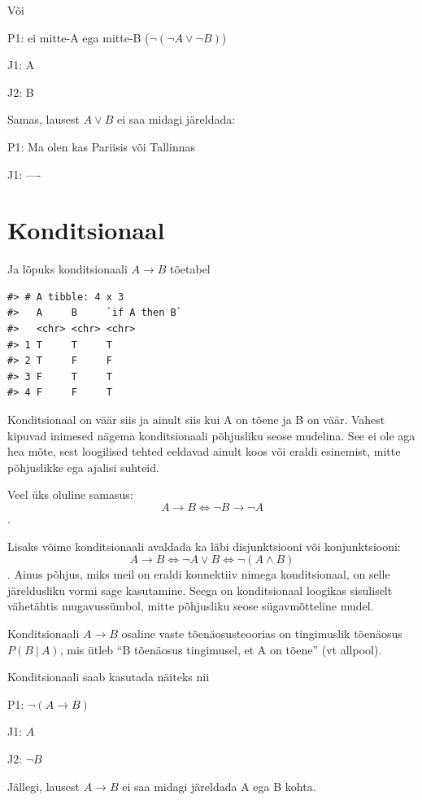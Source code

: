 \documentclass[]{book}
\begin{document}
Või

P1: ei mitte-A ega mitte-B (\(\neg (\neg A \lor \neg B)\))

J1: A

J2: B

Samas, lausest \(A \lor B\) ei saa midagi järeldada:

P1: Ma olen kas Pariisis või Tallinnas

J1: ----

\hypertarget{konditsionaal}{%
\section{Konditsionaal}\label{konditsionaal}}

Ja lõpuks konditsionaali \(A \rightarrow B\) tõetabel

\begin{verbatim}
#> # A tibble: 4 x 3
#>   A     B     `if A then B`
#>   <chr> <chr> <chr>        
#> 1 T     T     T            
#> 2 T     F     F            
#> 3 F     T     T            
#> 4 F     F     T
\end{verbatim}

Konditsionaal on väär siis ja ainult siis kui A on tõene ja B on väär. Vahest kipuvad inimesed nägema konditsionaali põhjusliku seose mudelina. See ei ole aga hea mõte, sest loogilised tehted eeldavad ainult koos või eraldi esinemist, mitte põhjuslikke ega ajalisi suhteid.

Veel üks oluline samasus: \[A \rightarrow B \Leftrightarrow \neg B \rightarrow \neg A\].

Lisaks võime konditsionaali avaldada ka läbi disjunktsiooni või konjunktsiooni: \[A \rightarrow B \Leftrightarrow \neg A \lor B \Leftrightarrow \neg(A \land B)\]. Ainus põhjus, miks meil on eraldi konnektiiv nimega konditsionaal, on selle järeldusliku vormi sage kasutamine. Seega on konditsionaal loogikas sisuliselt vähetähtis mugavussümbol, mitte põhjusliku seose sügavmõtteline mudel.

Konditsionaali \(A \rightarrow B\) osaline vaste tõenäosusteoorias on tingimuslik tõenäosus \(P(B ~\vert~ A)\), mis ütleb ``B tõenäosus tingimusel, et A on tõene'' (vt allpool).

Konditsionaali saab kasutada näiteks nii

P1: \(\neg (A \rightarrow B)\)

J1: \(A\)

J2: \(\neg B\)

Jällegi, lausest \(A \rightarrow B\) ei saa midagi järeldada A ega B kohta.
\end{document}
